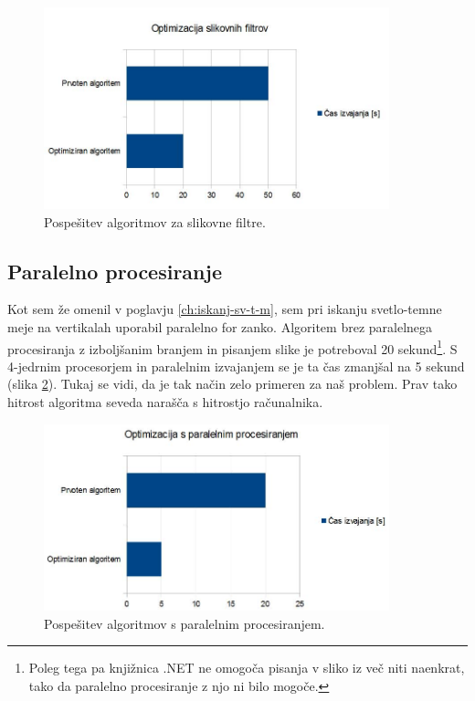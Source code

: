 \documentclass[oneside, a4paper, 12pt]{book}
\begin{document}
\begin{figure}
\begin{center}
\includegraphics[width=10cm]{slike/optimizacija_grafi/optimizacija-slikovnih-filtrov.jpg}
\end{center}
\caption{Pospešitev algoritmov za slikovne filtre.}
\label{pic:opt-sf}
\end{figure}


\subsection{Paralelno procesiranje}
Kot sem že omenil v poglavju \ref{ch:iskanj-sv-t-m}, sem pri iskanju svetlo-temne meje na vertikalah uporabil paralelno for zanko. Algoritem brez paralelnega procesiranja z izboljšanim branjem in pisanjem slike je potreboval 20 sekund\footnote{Poleg tega pa knjižnica .NET ne omogoča pisanja v sliko iz več niti naenkrat, tako da paralelno procesiranje z njo ni bilo mogoče.}. S 4-jedrnim procesorjem in paralelnim izvajanjem se je ta čas zmanjšal na 5 sekund (slika \ref{pic:opt-p}). Tukaj se vidi, da je tak način zelo primeren za naš problem. Prav tako hitrost algoritma seveda narašča s hitrostjo računalnika.


\begin{figure}
\begin{center}
\includegraphics[width=10cm]{slike/optimizacija_grafi/optimizacija-s-paralelnim-procesiranjem.jpg}
\end{center}
\caption{Pospešitev algoritmov s paralelnim procesiranjem.}
\label{pic:opt-p}
\end{figure}
\end{document}
